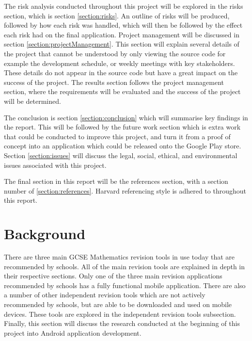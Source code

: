 \documentclass{article}
\begin{document}
The risk analysis conducted throughout this project will be explored in the risks section, which is section \ref{section:risks}. An outline of risks will be produced, followed by how each risk was handled, which will then be followed by the effect each risk had on the final application. Project management will be discussed in section \ref{section:projectManagement}. This section will explain several details of the project that cannot be understood by only viewing the source code for example the development schedule, or weekly meetings with key stakeholders. These details do not appear in the source code but have a great impact on the success of the project. The results section follows the project management section, where the requirements will be evaluated and the success of the project will be determined. \par

The conclusion is section \ref{section:conclusion} which will summarise key findings in the report. This will be followed by the future work section which is extra work that could be conducted to improve this project, and turn it from a proof of concept into an application which could be released onto the Google Play store. Section \ref{section:issues} will discuss the legal, social, ethical, and environmental issues associated with this project. \par

The final section in this report will be the references section, with a section number of \ref{section:references}. Harvard referencing style is adhered to throughout this report.\par

\section{Background}
\label{section:background}

There are three main GCSE Mathematics revision tools in use today that are recommended by schools. All of the main revision tools are explained in depth in their respective sections. Only one of the three main revision applications recommended by schools has a fully functional mobile application. There are also a number of other independent revision tools which are not actively recommended by schools, but are able to be downloaded and used on mobile devices. These tools are explored in the independent revision tools subsection. Finally, this section will discuss the research conducted at the beginning of this project into Android application development. \par
\end{document}
